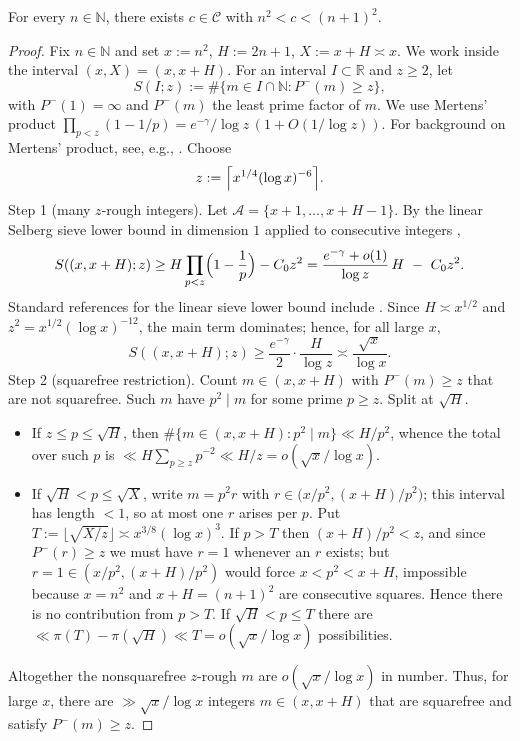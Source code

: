 \begin{theorem}\label{thm:legendre_cyclics}
For every \(n\in\mathbb{N}\), there exists \(c\in\mathcal{C}\) with \(n^2<c<(n+1)^2\).
\end{theorem}
\begin{proof}
Fix $n\in\mathbb N$ and set $x:=n^2$, $H:=2n+1$, $X:=x+H\asymp x$. We work inside the interval $(x,X)=(x,x+H)$. For an interval $I\subset\mathbb R$ and $z\ge2$, let
\[
S(I;z):=\#\{m\in I\cap\mathbb N: P^-(m)\ge z\},
\]
with $P^-(1)=\infty$ and $P^-(m)$ the least prime factor of $m$. We use Mertens' product $\prod_{p<z}(1-1/p)=e^{-\gamma}/\log z\,(1+O(1/\log z))$. For background on Mertens' product, see, e.g., \cite{Apostol1976}.
Choose
\[
z:=\Bigl\lceil x^{1/4}(\log x)^{-6}\Bigr\rceil.
\]
Step 1 (many $z$-rough integers). Let $\mathcal A=\{x+1,\dots,x+H-1\}$. By the linear Selberg sieve lower bound in dimension $1$ applied to consecutive integers \cite{HalRich1974,IK2004},
\[
S((x,x+H);z)\ge H\prod_{p<z}\Bigl(1-{1\over p}\Bigr)-C_0 z^2
=\frac{e^{-\gamma}+o(1)}{\log z}\,H\ -\ C_0 z^2.
\]
Standard references for the linear sieve lower bound include \cite{HalRich1974,IK2004}.
Since $H\asymp x^{1/2}$ and $z^2=x^{1/2}(\log x)^{-12}$, the main term dominates; hence, for all large $x$,
\[
S((x,x+H);z)\ge \frac{e^{-\gamma}}{2}\cdot\frac{H}{\log z}
\asymp \frac{\sqrt x}{\log x}.
\]
Step 2 (squarefree restriction). Count $m\in(x,x+H)$ with $P^-(m)\ge z$ that are not squarefree. Such $m$ have $p^2\mid m$ for some prime $p\ge z$. Split at $\sqrt H$.
\begin{itemize}
\item If $z\le p\le\sqrt H$, then $\#\{m\in(x,x+H): p^2\mid m\}\ll H/p^2$, whence the total over such $p$ is $\ll H\sum_{p\ge z}p^{-2}\ll H/z=o(\sqrt x/\log x)$.
\item If $\sqrt H<p\le\sqrt{X}$, write $m=p^2 r$ with $r\in\bigl(x/p^2,(x+H)/p^2\bigr)$; this interval has length $<1$, so at most one $r$ arises per $p$. Put $T:=\lfloor\sqrt{X/z}\rfloor\asymp x^{3/8}(\log x)^3$. If $p>T$ then $(x+H)/p^2<z$, and since $P^-(r)\ge z$ we must have $r=1$ whenever an $r$ exists; but $r=1\in(x/p^2,(x+H)/p^2)$ would force $x<p^2<x+H$, impossible because $x=n^2$ and $x+H=(n+1)^2$ are consecutive squares. Hence there is no contribution from $p>T$. If $\sqrt H<p\le T$ there are $\ll \pi(T)-\pi(\sqrt H)\ll T=o(\sqrt x/\log x)$ possibilities.
\end{itemize}
Altogether the nonsquarefree $z$-rough $m$ are $o(\sqrt x/\log x)$ in number.
Thus, for large $x$, there are $\gg \sqrt x/\log x$ integers $m\in(x,x+H)$ that are squarefree and satisfy $P^-(m)\ge z$.


\end{proof}
